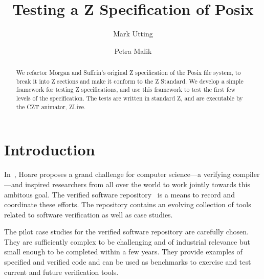 \documentclass{llncs}
\begin{document}
\pagestyle{headings}  %
%
\title{Testing a Z Specification of Posix}
%
\author{Mark Utting \and Petra Malik}
%
%
%

\maketitle              %

\begin{abstract}
We refactor Morgan and Suffrin's original Z specification of the
Posix file system, to break it into Z sections and make it conform
to the Z Standard.  We develop a simple framework for testing Z
specifications, and use this framework to test the first few levels
of the specification.  The tests are written in standard Z, and are
executable by the CZT animator, ZLive.
\end{abstract}

\section{Introduction}

In~\cite{Hoa03}, Hoare proposes a grand challenge for computer
science---a verifying compiler---and inspired researchers from all
over the world to work jointly towards this ambitous goal.  The
verified software repository~\cite{BicHoaWoo06} is a means to record
and coordinate these efforts.  The repository contains an evolving
collection of tools related to software verification as well as case
studies.

The pilot case studies for the verified software repository are
carefully chosen.  They are sufficiently complex to be challenging and
of industrial relevance but small enough to be completed within a few
years.  They provide examples of specified and verified code and can
be used as benchmarks to exercise and test current and future
verification tools.
\end{document}
